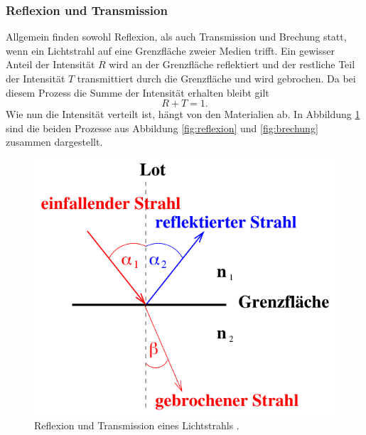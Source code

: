 \subsubsection*{Reflexion und Transmission}
\label{sec:RefTrans}
Allgemein finden sowohl Reflexion, als auch Transmission und Brechung statt, wenn ein Lichtstrahl auf eine Grenzfläche zweier
Medien trifft. Ein gewisser Anteil der Intensität $R$ wird an der Grenzfläche reflektiert und der restliche
Teil der Intensität $T$ transmittiert durch die Grenzfläche und wird gebrochen. Da bei diesem Prozess die
Summe der Intensität erhalten bleibt gilt
\begin{equation}
    R+T=1.
\end{equation}
Wie nun die Intensität verteilt ist, hängt von den Materialien ab. In Abbildung \ref{fig:RefTrans}
sind die beiden Prozesse aus Abbildung \ref{fig:reflexion} und \ref{fig:brechung} zusammen dargestellt.
\begin{figure}[H]
    \centering
    \includegraphics[scale = 0.5]{pictures/ReflexionTransmission.png}
    \caption{Reflexion und Transmission eines Lichtstrahls \cite{AP01}.}
    \label{fig:RefTrans}
\end{figure}

